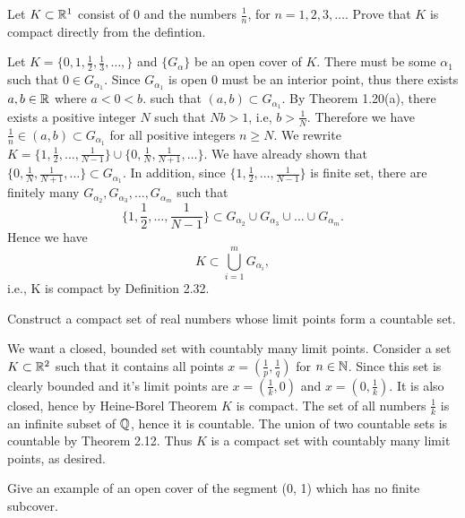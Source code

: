 \begin{problem}
  Let $K \subset \mathbb{R}^1$ consist of $0$ and the numbers $\frac{1}{n}$, for $n = 1, 2, 3, \ldots$.
  Prove that $K$ is compact directly from the defintion.
\end{problem}

\begin{solution}
  Let $K = \{0, 1, \frac{1}{2}, \frac{1}{3}, \ldots, \}$ and $\{G_{\alpha}\}$ be an open cover of $K$.
  There must be some $\alpha_1$ such that $0 \in G_{\alpha_1}$.
  Since $G_{\alpha_1}$ is open 0 must be an interior point, thus there exists $a, b \in \mathbb{R}$ where $a < 0 < b$. such that $(a, b) \subset G_{\alpha_1}$.
  By Theorem 1.20(a), there exists a positive integer $N$ such that $Nb > 1$, i.e, $b > \frac{1}{N}$.
  Therefore we have $\frac{1}{n} \in (a, b) \subset G_{\alpha_1}$ for all positive integers $n \ge N$.
  We rewrite $K = \{1, \frac{1}{2}, \ldots, \frac{1}{N - 1}\} \cup \{0, \frac{1}{N}, \frac{1}{N + 1}, \ldots\}$.
  We have already shown that $\{0, \frac{1}{N}, \frac{1}{N + 1}, \ldots\} \subset G_{\alpha_1}$.
  In addition, since $\{1, \frac{1}{2}, \ldots, \frac{1}{N - 1}\}$ is finite set, there are finitely many $G_{\alpha_2}, G_{\alpha_3}, \ldots, G_{\alpha_m}$ such that
  \[\{1, \frac{1}{2}, \ldots, \frac{1}{N - 1}\} \subset G_{\alpha_2} \cup G_{\alpha_3} \cup \ldots \cup G_{\alpha_m}.\]
  Hence we have
  \[K \subset \bigcup_{i = 1}^{m} G_{\alpha_i},\]
  i.e., K is compact by Definition 2.32.
\end{solution}

\begin{problem}
  Construct a compact set of real numbers whose limit points form a countable set.
\end{problem}

\begin{solution}
  We want a closed, bounded set with countably many limit points.
  Consider a set $K \subset \mathbb{R}^2$ such that it contains all points $x = (\frac{1}{p}, \frac{1}{q})$ for $n \in \mathbb{N}$.
  Since this set is clearly bounded and it's limit points are $x = (\frac{1}{k}, 0)$ and $x = (0, \frac{1}{k})$.
  It is also closed, hence by Heine-Borel Theorem $K$ is compact.
  The set of all numbers $\frac{1}{k}$ is an infinite subset of $\mathbb{Q}$, hence it is countable.
  The union of two countable sets is countable by Theorem 2.12.
  Thus $K$ is a compact set with countably many limit points, as desired.
\end{solution}

\begin{problem}
  Give an example of an open cover of the segment (0, 1) which has no finite subcover.
\end{problem}

